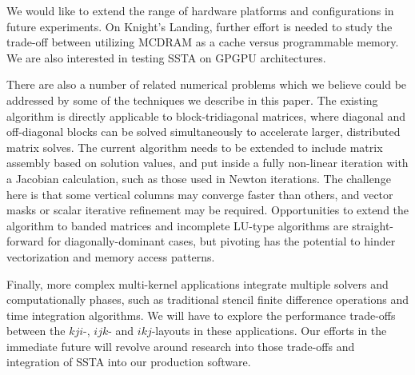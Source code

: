 \documentclass[10pt, conference, compsocconf]{IEEEtran}
\begin{document}
We would like to extend the range of hardware platforms and configurations in
  future experiments.
On Knight's Landing, further effort is needed to study the trade-off between
  utilizing MCDRAM as a cache versus programmable memory.
We are also interested in testing SSTA on GPGPU architectures.

There are also a number of related numerical problems which we believe could be
  addressed by some of the techniques we describe in this paper.
The existing algorithm is directly applicable to block-tridiagonal matrices,
  where diagonal and off-diagonal blocks can be solved simultaneously
  to accelerate larger, distributed matrix solves.
The current algorithm needs to be extended to include matrix assembly
  based on solution values, and put inside a fully non-linear iteration
  with a Jacobian calculation, such as those used in Newton iterations.
The challenge here is that some vertical columns may converge faster than
  others, and vector masks or scalar iterative refinement may be required.
Opportunities to extend the algorithm to banded matrices and incomplete LU-type 
  algorithms are straight-forward for diagonally-dominant cases, but
  pivoting has the potential to hinder vectorization and memory access patterns.

Finally, more complex multi-kernel applications integrate multiple solvers and
  computationally phases, such as traditional stencil finite difference
  operations and time integration algorithms. 
We will have to explore the performance trade-offs between
  the \(kji\)-, \(ijk\)- and \(ikj\)-layouts in these applications.
Our efforts in the immediate future will revolve around research into those
  trade-offs and integration of SSTA into our production software.

%



\end{document}
